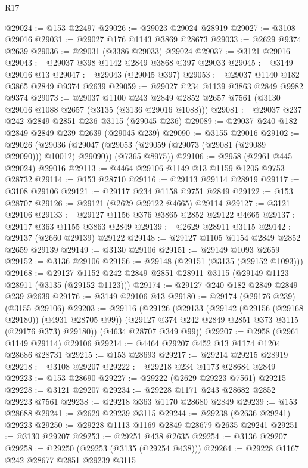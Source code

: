 \begin{lexlean}{R17}
\begin{coremodule}
@29024 := @153 @22497
@29026 := @29023 @29024 @28919
@29027 := @3108 @29016
@29031 := @29027 @176 @1143 @3869 @28673
@29033 := @2629 @9374 @2639
@29036 := @29031 (@3386 @29033) @29024
@29037 := @3121 @29016
@29043 := @29037 @398 @1142 @2849 @3868 @397 @29033
@29045 := @3149 @29016 @13
@29047 := @29043 (@29045 @397)
@29053 := @29037 @1140 @182 @3865 @2849 @9374 @2639
@29059 := @29027 @234 @1139 @3863 @2849 @9982 @9374
@29073 := @29037
    @1100
    @243
    @2849
    @2852
    @2657
    @7561
    (@3130 @29016 @1088 @2657 (@3135 (@3136 @29016 @1088)))
@29081 := @29037 @237 @242 @2849 @2851 @236 @3115 (@29045 @236)
@29089 := @29037 @240 @182 @2849 @2849 @239 @2639 (@29045 @239)
@29090 := @3155 @29016
@29102 := @29026
    (@29036
      (@29047 (@29053 (@29059 (@29073 (@29081 (@29089 @29090))) @10012) @29090))
      (@7365 @8975))
@29106 := @2958 (@2961 @445 @29024) @29016
@29113 := @4464 @29106 @1149 @13 @1159 @1205 @9753 @28732
@29114 := @153 @28710
@29116 := @29113 @29114 @28919
@29117 := @3108 @29106
@29121 := @29117 @234 @1158 @9751 @2849
@29122 := @153 @28707
@29126 := @29121 (@2629 @29122 @4665) @29114
@29127 := @3121 @29106
@29133 := @29127 @1156 @376 @3865 @2852 @29122 @4665
@29137 := @29117 @363 @1155 @3863 @2849
@29139 := @2629 @28911 @3115
@29142 := @29137 (@2660 @29139) @29122
@29148 := @29127 @1105 @1154 @2849 @2852 @2659 @29139
@29149 := @3130 @29106
@29151 := @29149 @1093 @2659
@29152 := @3136 @29106
@29156 := @29148 (@29151 (@3135 (@29152 @1093)))
@29168 := @29127 @1152 @242 @2849 @2851 @28911 @3115 (@29149 @1123 @28911 (@3135 (@29152 @1123)))
@29174 := @29127 @240 @182 @2849 @2849 @239 @2639
@29176 := @3149 @29106 @13
@29180 := @29174 (@29176 @239) (@3155 @29106)
@29203 := @29116
    (@29126
      (@29133
        (@29142 (@29156 (@29168 @29180)) (@4931 @28705 @99))
        (@29127 @374 @242 @2849 @2851 @373 @3115 (@29176 @373) @29180))
      (@4634 @28707 @349 @99))
@29207 := @2958 (@2961 @1149 @29114) @29106
@29214 := @4464 @29207 @452 @13 @1174 @1204 @28686 @28731
@29215 := @153 @28693
@29217 := @29214 @29215 @28919
@29218 := @3108 @29207
@29222 := @29218 @234 @1173 @28684 @2849
@29223 := @153 @28690
@29227 := @29222 (@2629 @29223 @7561) @29215
@29228 := @3121 @29207
@29234 := @29228 @1171 @243 @28682 @2852 @29223 @7561
@29238 := @29218 @363 @1170 @28680 @2849
@29239 := @153 @28688
@29241 := @2629 @29239 @3115
@29244 := @29238 (@2636 @29241) @29223
@29250 := @29228 @1113 @1169 @2849 @28679 @2635 @29241
@29251 := @3130 @29207
@29253 := @29251 @438 @2635
@29254 := @3136 @29207
@29258 := @29250 (@29253 (@3135 (@29254 @438)))
@29264 := @29228 @1167 @242 @28677 @2851 @29239 @3115

\end{coremodule}
\end{lexlean}
